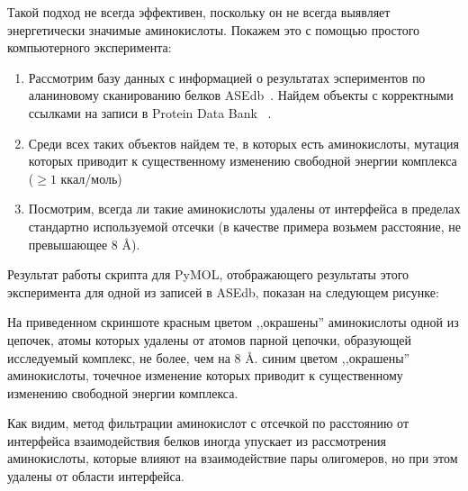 Такой подход не всегда эффективен, поскольку он не всегда выявляет энергетически значимые аминокислоты. Покажем это с помощью простого компьютерного эксперимента:
\begin{enumerate}
\item Рассмотрим базу данных с информацией о результатах эспериментов по аланиновому сканированию белков ASEdb~\cite{asedb2001}. Найдем объекты с корректными ссылками на записи в Protein Data Bank ~\cite{rcsb}.
\item Среди всех таких объектов найдем те, в которых есть аминокислоты, мутация которых приводит к существенному изменению свободной энергии комплекса ($\geq 1$ ккал/моль)
\item Посмотрим, всегда ли такие аминокислоты удалены от интерфейса в пределах стандартно используемой отсечки (в качестве примера возьмем расстояние, не превышающее 8 \AA{}).
\end{enumerate}

Результат работы скрипта для PyMOL, отображающего результаты этого эксперимента для одной из записей в ASEdb, показан на следующем рисунке: 


На приведенном скриншоте красным цветом ,,окрашены'' аминокислоты одной из цепочек, атомы которых удалены от атомов парной цепочки, образующей исследуемый комплекс, не более, чем на 8 \AA{}. синим цветом ,,окрашены'' аминокислоты, точечное изменение которых приводит к существенному изменению свободной энергии комплекса. 

Как видим, метод фильтрации аминокислот с отсечкой по расстоянию от интерфейса взаимодействия белков иногда упускает из рассмотрения аминокислоты, которые влияют на взаимодействие пары олигомеров, но при этом удалены от области интерфейса.

